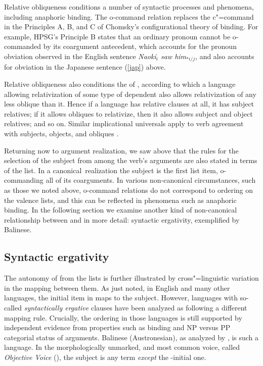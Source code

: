 \documentclass[output=paper
	        ,collection
	        ,collectionchapter
 	        ,biblatex
                ,babelshorthands
                ,newtxmath
                ,draftmode
                ,colorlinks, citecolor=brown
]{langscibook}
\begin{document}
Relative obliqueness conditions a number of syntactic processes and phenomena, including anaphoric binding.  The o-command relation replaces the c"=command in the Principles A, B, and C of Chomsky's \citeyearpar{Chomsky:1981} configurational theory of binding.  For example, HPSG's Principle B states that an ordinary pronoun cannot be o-commanded by its coargument antecedent, which accounts for the pronoun obviation observed in the English sentence \textit{Naoki$_i$ saw him$_{*i/j}$}, and also accounts for obviation in the Japanese sentence (\ref{jap}) above.  

Relative obliqueness also conditions the  of \citet{KeenanandComrie1977}, according to which a language allowing relativization of some type of dependent also allows relativization of any less oblique than it.  Hence if a language has relative clauses at all, it has subject relatives; if it allows obliques to relativize, then it also allows subject and object relatives; and so on.  
Similar implicational universals apply to verb agreement with subjects, objects, and obliques  \citep{greenberg:1966}.  

Returning now to argument realization, we saw above that the rules for the selection of the subject from among the verb's arguments are also stated in terms of the \argst list.  In a canonical\ realization the subject is the first list item, o-commanding all of its coarguments.
In various non-canonical circumstances, such as those we noted above, o-command relations do not correspond to ordering on the valence lists, and this can be reflected in phenomena such as anaphoric binding.
In the following section we examine another kind of non-canonical relationship between \argst and \val in more detail: syntactic ergativity, exemplified by Balinese.

\subsection{Syntactic ergativity}
\label{ergativity}\label{arg-st-sec-ergativity}
The autonomy of \argst from the \val lists is further illustrated by cross"=linguistic variation in the mapping between them.  As just noted, in English and many other languages, the initial item in \argst maps to the subject.  However,  languages with so-called \emph{syntactically ergative} clauses have been analyzed as following a different mapping rule.  Crucially, the \argst ordering in those languages is still supported by independent evidence from properties such as binding and NP versus PP categorial status of arguments.
Balinese (Austronesian), as analyzed by \citet{Wechsler+Arka:1998}, is such a language.  In the morphologically unmarked, and most common voice, called \emph{Objective Voice} (), the subject is any term \textit{except} the \argst-initial one.   
\end{document}
